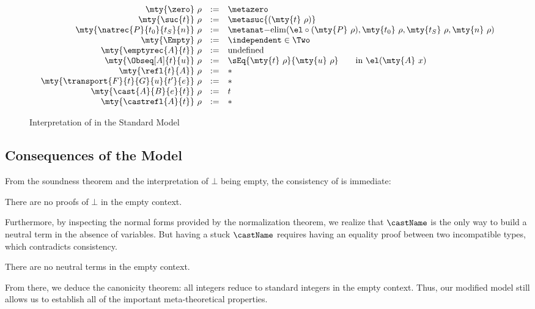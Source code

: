 \begin{figure}
\begin{small}
\[\begin{array}{rcl}
  \mty{\zero}\ \rho & := & \metazero \\
  \mty{\suc{t}}\ \rho & := & \metasuc{(\mty{t}\ \rho)} \\
  \mty{\natrec{P}{t_0}{t_S}{n}}\ \rho & := & \metanat\mathrm{-elim}(\el \circ (\mty{P}\ \rho), \mty{t_0}\ \rho, \mty{t_S}\ \rho, \mty{n}\ \rho)\\
  \mty{\Empty}\ \rho & := & \independent \in \Two \\
  \mty{\emptyrec{A}{t}}\ \rho & := & \text{undefined} \\
  \mty{\Obseq[A]{t}{u}}\ \rho & := & \sEq{\mty{t}\ \rho}{\mty{u}\ \rho} \qquad\text{in }\el(\mty{A}\ x) \\
  \mty{\refl{t}{A}}\ \rho & := & * \\
  \mty{\transport{F}{t}{G}{u}{t'}{e}}\ \rho & := & * \\
  \mty{\cast{A}{B}{e}{t}}\ \rho & := & t\\
  \mty{\castrefl{A}{t}}\ \rho & := & *
\end{array}
\]
\end{small}
  \caption{Interpretation of \SetoidCC in the Standard Model}
  \label{fig:interpretation}
\end{figure}

\subsection{Consequences of the Model}

From the soundness theorem and the interpretation of \( \bot \) being empty,
the consistency of \SetoidCC is immediate:

\begin{theorem}[Consistency]
  There are no proofs of \( \bot \) in the empty context.
\end{theorem}

Furthermore, by inspecting the normal forms provided by the normalization
theorem, we realize that \( \castName \) is the only way to build a neutral
term in the absence of variables. But having a stuck \( \castName \) requires
having an equality proof between two incompatible types, which contradicts
consistency.

\begin{theorem}
  There are no neutral terms in the empty context.
\end{theorem}

From there, we deduce the canonicity theorem: all integers reduce to
standard integers in the empty context. Thus, our modified model still allows
us to establish all of the important meta-theoretical properties.

